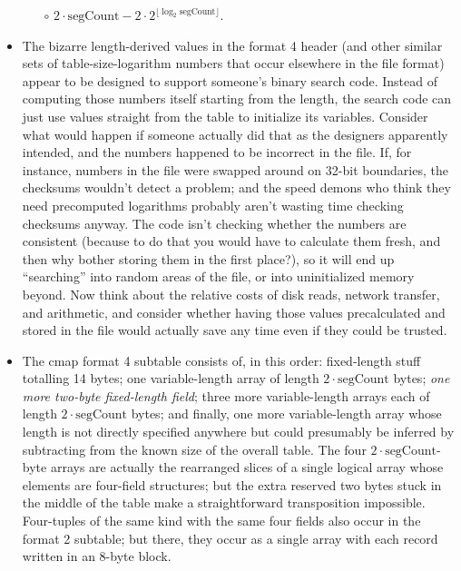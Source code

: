 \documentclass[twocolumn]{report}
\begin{document}
\begin{itemize}
\begin{itemize}
      \item[$\circ$] $2 \cdot \textrm{segCount}-2 \cdot 2^{\lfloor \log_2
        \textrm{segCount} \rfloor}$.
    \end{itemize}
  \item The bizarre length-derived values in the format 4 header (and
    other similar sets of table-size-logarithm numbers that occur
    elsewhere in the file format) appear to be designed to support
    someone's binary search code.  Instead of computing those numbers
    itself starting from the length, the search code can just use
    values straight from the table to initialize its variables.
    Consider what would happen if someone actually did that as the
    designers apparently intended, and the numbers happened to be incorrect
    in the file.  If, for instance, numbers in the file were swapped
    around on 32-bit boundaries, the checksums wouldn't detect a problem; and
    the speed demons who think they need precomputed logarithms
    probably aren't wasting time checking checksums anyway.
    The code isn't checking whether the numbers are consistent (because
    to do that you would have to calculate them fresh, and then why bother
    storing them in the first place?), so it will end up ``searching'' into
    random areas of the file, or into uninitialized memory beyond.  Now
    think about the relative costs of disk reads, network transfer, and
    arithmetic, and consider whether having those values precalculated
    and stored in the file would actually save any time even if they
    could be trusted.
  \item The cmap format 4 subtable consists of, in this order: fixed-length
    stuff totalling 14 bytes; one variable-length array of length $2
    \cdot \textrm{segCount}$ bytes; \emph{one more two-byte
    fixed-length field}; three more variable-length arrays each of
    length $2 \cdot \textrm{segCount}$ bytes; and finally, one more
    variable-length array whose length is not directly specified
    anywhere but could presumably be inferred by subtracting from the
    known size of the overall table. The four $2 \cdot
    \textrm{segCount}$-byte arrays are actually the rearranged slices
    of a single logical array whose elements are four-field
    structures; but the extra reserved two bytes
    stuck in the middle of the table make a straightforward transposition
    impossible.  Four-tuples of the same kind with the same four fields
    also occur in the format 2 subtable; but there, they occur as a single
    array with each record written in an 8-byte block.

\end{itemize}
\end{document}
